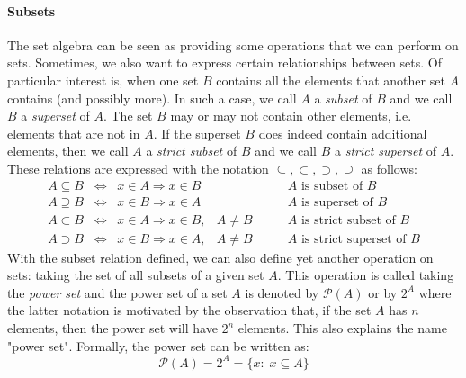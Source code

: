 \paragraph{Subsets} The set algebra can be seen as providing some operations that we can perform on sets. Sometimes, we also want to express certain relationships between sets. Of particular interest is, when one set $B$ contains all the elements that another set $A$ contains (and possibly more). In such a case, we call $A$ a \emph{subset} of $B$ and we call $B$ a \emph{superset} of $A$. The set $B$ may or may not contain other elements, i.e. elements that are not in $A$. If the superset $B$ does indeed contain additional elements, then we call $A$ a \emph{strict subset} of $B$ and we call $B$ a \emph{strict superset} of $A$. These relations are expressed with the notation $\subseteq, \subset, \supset, \supseteq$ as follows:
\begin{eqnarray}
A \subseteq B \;\;  \Leftrightarrow \;\;   x \in A \Rightarrow x \in B&           \qquad & \text{$A$ is subset of $B$} \\
A \supseteq B \;\;  \Leftrightarrow \;\;   x \in B \Rightarrow x \in A&           \qquad & \text{$A$ is superset of $B$} \\
A \subset   B \;\;  \Leftrightarrow \;\;   x \in A \Rightarrow x \in B,& A \neq B \qquad & \text{$A$ is strict subset of $B$} \\
A \supset   B \;\;  \Leftrightarrow \;\;   x \in B \Rightarrow x \in A,& A \neq B \qquad & \text{$A$ is strict superset of $B$}
\end{eqnarray}
With the subset relation defined, we can also define yet another operation on sets: taking the set of all subsets of a given set $A$. This operation is called taking the \emph{power set} and the power set of a set $A$ is denoted by $\mathcal{P}(A)$ or by $2^A$ where the latter notation is motivated by the observation that, if the set $A$ has $n$ elements, then the power set will have $2^n$ elements. This also explains the name "power set". Formally, the power set can be written as:
\begin{equation}
  \mathcal{P}(A) = 2^A = \{x : \; x \subseteq A \}
\end{equation}
